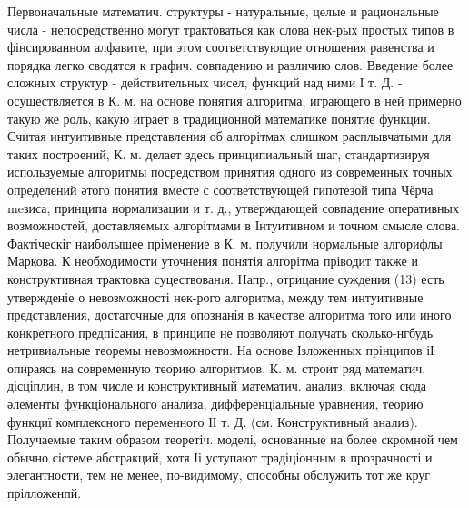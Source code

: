 \documentclass[10pt]{article}
\begin{document}
Первоначальные математич. структуры - натуральные, целые и рациональные числа - непосредственно могут трактоваться как слова нек-рых простых типов в фінсированном алфавите, при этом соответствующие отношения равенства и порядка легко сводятся к графич. совпадению и различию слов. Введение более сложных структур - действительных чисел, функций над ними І т. Д. - осуществляется в К. м. на основе понятия алгоритма, играющего в ней примерно такую же роль, какую играет в традиционной математике понятие функции. Считая интуитивные представления об алгорітмах слишком расплывчатыми для таких построений, К. м. делает здесь принципиальный шаг, стандартизируя используемые алгоритмы посредством принятия одного из современных точных определений әтого понятия вместе с соответствующей гипотезой типа Чёрча meзиса, принципа нормализации и т. д., утверждающей совпадение оперативных возможностей, доставляемых алгорітмами в Інтуитивном и точном смысле слова. Фактіческіг наиболышее пріменение в К. м. получили нормальные алгорифлы Маркова. К необходимости уточнения понятія алгорітма пріводит также и конструктивная трактовка суцествованıя. Напр., отрицание суждения (13) есть утвержденіе о невозможності нек-рого алгоритма, между тем интуитивные представления, достаточные для опознанія в качестве алгоритма того или иного конкретного предпісания, в принципе не позволяют получать сколько-нгбудь нетривиальные теоремы невозможности. На основе Ізложенных прінципов іІ опираясь на современную теорию алгоритмов, К. м. строит ряд математич. дісціплин, в том числе и конструктивный математич. анализ, включая сюда әлементы функціонального анализа, дифференціальные уравнения, теорию функциї комплексного переменного ІІ т. Д. (см. Конструктивный анализ). Получаемые таким образом теоретіч. моделі, основанные на более скромной чем обычно сістеме абстракций, хотя Іі уступают традіціонным в прозрачності и элегантности, тем не менее, по-видимому, способны обслужить тот же круг прілложенпй.
\end{document}
